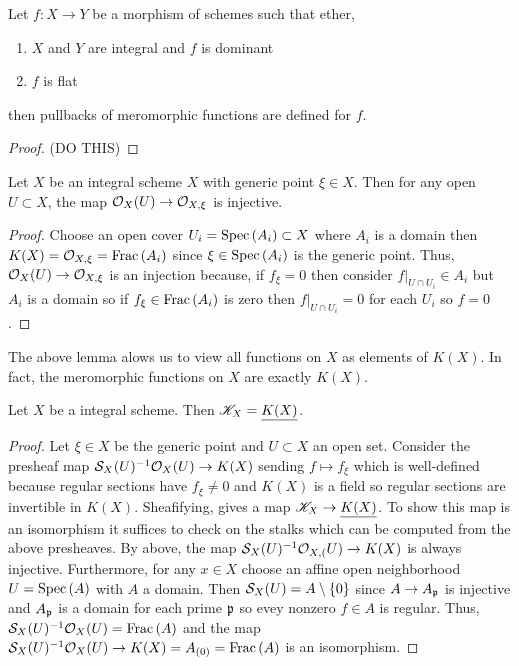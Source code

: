 \documentclass[12pt]{article}
\begin{document}
\begin{prop}
Let $f : X \to Y$ be a morphism of schemes such that ether,
\begin{enumerate}
\item $X$ and $Y$ are integral and $f$ is dominant
\item $f$ is flat
\end{enumerate}
then pullbacks of meromorphic functions are defined for $f$.
\end{prop}

\begin{proof}
(DO THIS)
\end{proof}



\begin{lemma}
Let $X$ be an integral scheme $X$ with generic point $\xi \in X$. Then for any open $U \subset X$, the map $\struct{X}(U) \to \stalk{X}{\xi}$ is injective.
\end{lemma}

\begin{proof}
Choose an open cover $U_i = \Spec{A_i} \subset X$ where $A_i$ is a domain then $K(X) = \stalk{X}{\xi} = \Frac{A_i}$ since $\xi \in \Spec{A_i}$ is the generic point. Thus, $\struct{X}(U) \to \stalk{X}{\xi}$ is an injection because, if $f_\xi = 0$ then consider $f|_{U \cap U_i} \in A_i$ but $A_i$ is a domain so if $f_\xi \in \Frac{A_i}$ is zero then $f|_{U \cap U_i} = 0$ for each $U_i$ so $f = 0$. 
\end{proof}

\begin{rmk}
The above lemma alows us to view all functions on $X$ as elements of $K(X)$. In fact, the meromorphic functions on $X$ are exactly $K(X)$. 
\end{rmk}

\begin{prop}
Let $X$ be a integral scheme. Then $\K_X = \underline{K(X)}$.
\end{prop}

\begin{proof}
Let $\xi \in X$ be the generic point and $U \subset X$ an open set. Consider the  presheaf map $\S_X(U)^{-1} \struct{X}(U) \to K(X)$ sending $f \mapsto f_\xi$ which is well-defined because regular sections have $f_\xi \neq 0$ and $K(X)$ is a field so regular sections are invertible in $K(X)$. Sheafifying, gives a map $\K_X \to \underline{K(X)}$. To show this map is an isomorphism it suffices to check on the stalks which can be computed from the above presheaves. By above, the map $\S_X(U)^{-1} \stalk{X}(U) \to K(X)$ is always injective. Furthermore, for any $x \in X$ choose an affine open neighborhood $U = \Spec{A}$ with $A$ a domain. Then $\S_X(U) = A \setminus \{ 0 \}$ since $A \to A_\p$ is injective and $A_\p$ is a domain for each prime $\p$ so evey nonzero $f \in A$ is regular. Thus, $\S_X(U)^{-1} \struct{X}(U) = \Frac{A}$ and the map $\S_X(U)^{-1} \struct{X}(U) \to K(X) = A_{(0)} = \Frac{A}$ is an isomorphism.   
\end{proof}
\end{document}
